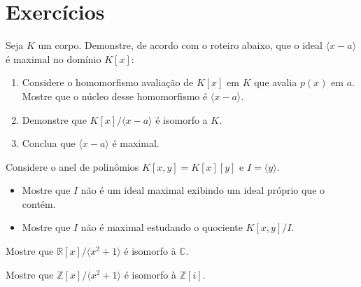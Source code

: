 \section{Exercícios}
\begin{exer}
    Seja $K$ um corpo. Demonstre, de acordo com o roteiro abaixo, que o ideal $\langle x-a\rangle$ é maximal no domínio $K[x]$:
    \begin{enumerate}[label=\alph*)]
        \item Considere o homomorfismo avaliação de $K[x]$ em $K$ que avalia $p(x)$ em $a$. Mostre que o núcleo desse homomorfismo é $\langle x-a\rangle$.
        \item Demonstre que $K[x]/\langle x-a\rangle$ é isomorfo a $K$.
        \item Conclua que $\langle x-a\rangle$ é maximal.
    \end{enumerate}
\end{exer}
\begin{exer}
    Considere o anel de polinômios $K[x, y]=K[x][y]$ e  $I=\langle y\rangle$.
    \begin{itemize}
        \item Mostre que $I$ não é um ideal maximal exibindo um ideal próprio que o contém.
        \item Mostre que $I$ não é maximal estudando o quociente $K[x, y]/I$.
    \end{itemize}
\end{exer}
\begin{exer}
Mostre que $\mathbb R[x]/\langle x^2+1\rangle$ é isomorfo à $\mathbb C$.
\end{exer}
\begin{exer}
    Mostre que $\mathbb Z[x]/\langle x^2+1\rangle$ é isomorfo à $\mathbb Z[i]$.
\end{exer}